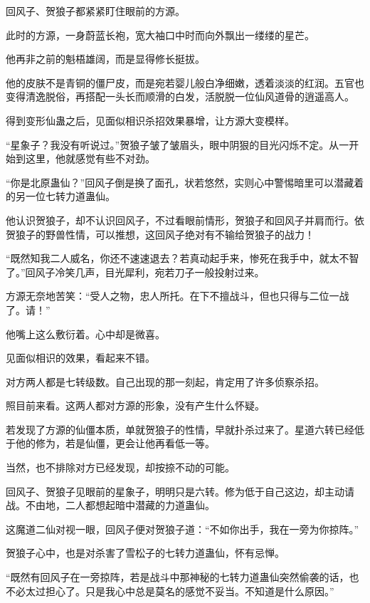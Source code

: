 
\begin{this_body}

回风子、贺狼子都紧紧盯住眼前的方源。

此时的方源，一身蔚蓝长袍，宽大袖口中时而向外飘出一缕缕的星芒。

他再非之前的魁梧雄阔，而是显得修长挺拔。

他的皮肤不是青铜的僵尸皮，而是宛若婴儿般白净细嫩，透着淡淡的红润。五官也变得清逸脱俗，再搭配一头长而顺滑的白发，活脱脱一位仙风道骨的逍遥高人。

得到变形仙蛊之后，见面似相识杀招效果暴增，让方源大变模样。

“星象子？我没有听说过。”贺狼子皱了皱眉头，眼中阴狠的目光闪烁不定。从一开始到这里，他就感觉有些不对劲。

“你是北原蛊仙？”回风子倒是换了面孔，状若悠然，实则心中警惕暗里可以潜藏着的另一位七转力道蛊仙。

他认识贺狼子，却不认识回风子，不过看眼前情形，贺狼子和回风子并肩而行。依贺狼子的野兽性情，可以推想，这回风子绝对有不输给贺狼子的战力！

“既然知我二人威名，你还不速速退去？若真动起手来，惨死在我手中，就太不智了。”回风子冷笑几声，目光犀利，宛若刀子一般投射过来。

方源无奈地苦笑：“受人之物，忠人所托。在下不擅战斗，但也只得与二位一战了。请！”

他嘴上这么敷衍着。心中却是微喜。

见面似相识的效果，看起来不错。

对方两人都是七转级数。自己出现的那一刻起，肯定用了许多侦察杀招。

照目前来看。这两人都对方源的形象，没有产生什么怀疑。

若发现了方源的仙僵本质，单就贺狼子的性情，早就扑杀过来了。星道六转已经低于他的修为，若是仙僵，更会让他再看低一等。

当然，也不排除对方已经发现，却按捺不动的可能。

回风子、贺狼子见眼前的星象子，明明只是六转。修为低于自己这边，却主动请战。不由地，二人都想起暗中潜藏的力道蛊仙。

这魔道二仙对视一眼，回风子便对贺狼子道：“不如你出手，我在一旁为你掠阵。”

贺狼子心中，也是对杀害了雪松子的七转力道蛊仙，怀有忌惮。

“既然有回风子在一旁掠阵，若是战斗中那神秘的七转力道蛊仙突然偷袭的话，也不必太过担心了。只是我心中总是莫名的感觉不妥当。不知道是什么原因。”


\end{this_body}
